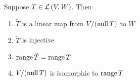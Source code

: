 \begin{theorem}
   Suppose $T \in \mathcal{L} \left( V, W \right)$. Then
   \begin{enumerate}
      \item $\tilde{T}$ is a linear map from $V / (\operatorname{null} T)$ to $W$
      \item $\tilde{T}$ is injective
      \item $\operatorname{range} \tilde{T} = \operatorname{range} T$
      \item $V / (\operatorname{null} T)$ is isomorphic to $\operatorname{range} T$
   \end{enumerate}
\end{theorem}
\endinput